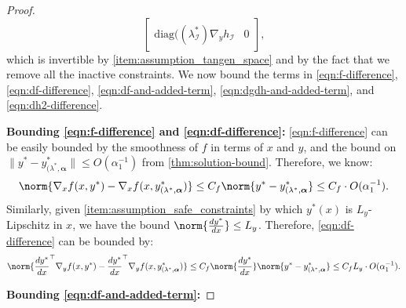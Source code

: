 \begin{proof}
\[\begin{bmatrix}
    \text{diag}((\lambda^*_\mathcal{I}) \nabla_y h_\mathcal{I} & 0
\end{bmatrix},\] which is invertible by \cref{item:assumption_tangen_space} and by the fact that we remove all the inactive constraints.
We now bound the terms in \cref{eqn:f-difference}, \cref{eqn:df-difference}, \cref{eqn:df-and-added-term}, \cref{eqn:dgdh-and-added-term}, and \cref{eqn:dh2-difference}.


\noindent\textbf{Bounding \cref{eqn:f-difference} and \cref{eqn:df-difference}:}
\cref{eqn:f-difference} can be easily bounded by the smoothness of $f$ 
in terms of $x$ and $y$, and the bound on $\|y^*- y_{(\lambda^*,\boldsymbol{\alpha}}^*\| \leq O({\alpha_1^{-1}})$ from \cref{thm:solution-bound}. Therefore, we know:
\begin{align*}
    \norm{\nabla_x f(x,y^*) - \nabla_x f(x,y_{(\lambda^*,\boldsymbol{\alpha}}^*)} \leq C_f \norm{y^* - y_{(\lambda^*,\boldsymbol{\alpha}}^*} \leq C_f\cdot O({\alpha_1^{-1}}). 
\end{align*}
Similarly, given \cref{item:assumption_safe_constraints}  by which $y^*(x)$ is $L_y$-Lipschitz in $x$, we have the bound $\norm{\frac{d y^*}{d x}} \leq L_y$. Therefore, \cref{eqn:df-difference} can be bounded by:
\begin{align*}
    \norm{\frac{dy^*}{dx}^\top \nabla_y f(x,y^*) - \frac{dy^*}{dx}^\top \nabla_y f(x,y_{(\lambda^*,\boldsymbol{\alpha}}^*)} \leq C_f \norm{\frac{dy^*}{dx}} \norm{y^* - y_{(\lambda^*,\boldsymbol{\alpha}}^*} \leq C_f L_y\cdot O({\alpha_1^{-1}}). 
\end{align*}


\noindent\textbf{Bounding \cref{eqn:df-and-added-term}:} 



\end{proof}
